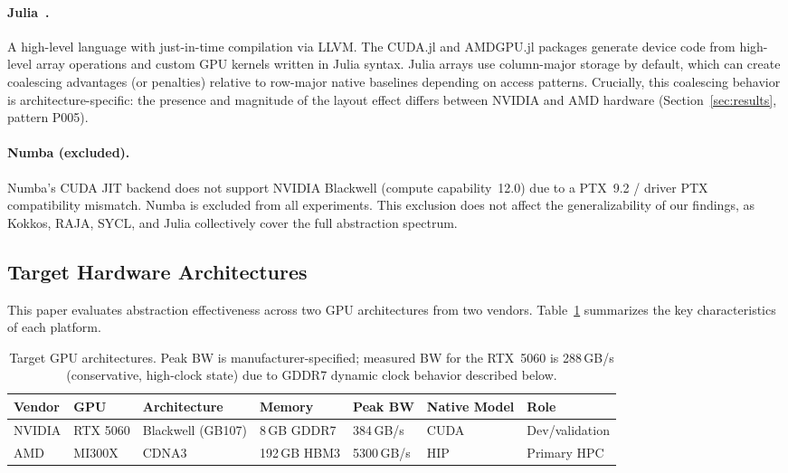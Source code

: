 \paragraph{Julia~\cite{Bezanson2017}.}
A high-level language with just-in-time compilation via LLVM. The CUDA.jl
and AMDGPU.jl packages generate device code from high-level array operations
and custom GPU kernels written in Julia syntax. Julia arrays use
column-major storage by default, which can create coalescing advantages
(or penalties) relative to row-major native baselines depending on
access patterns. Crucially, this coalescing behavior is
architecture-specific: the presence and magnitude of the layout effect
differs between NVIDIA and AMD hardware (Section~\ref{sec:results},
pattern P005).

\paragraph{Numba (excluded).}
Numba's CUDA JIT backend does not support NVIDIA Blackwell (compute
capability~12.0) due to a PTX~9.2 / driver PTX compatibility mismatch.
Numba is excluded from all experiments. This exclusion does not affect
the generalizability of our findings, as Kokkos, RAJA, SYCL, and Julia
collectively cover the full abstraction spectrum.

\subsection{Target Hardware Architectures}
\label{subsec:hardware}

This paper evaluates abstraction effectiveness across two GPU architectures
from two vendors. Table~\ref{tab:hardware} summarizes the key characteristics
of each platform.

\begin{table}[h]
\centering
\caption{Target GPU architectures. Peak BW is manufacturer-specified;
measured BW for the RTX~5060 is 288\,GB/s (conservative, high-clock state)
due to GDDR7 dynamic clock behavior described below.}
\label{tab:hardware}
\begin{tabular}{lllllll}
\hline
\textbf{Vendor} & \textbf{GPU} & \textbf{Architecture} & \textbf{Memory}
& \textbf{Peak BW} & \textbf{Native Model} & \textbf{Role} \\
\hline
NVIDIA & RTX 5060   & Blackwell (GB107) & 8\,GB GDDR7   &  384\,GB/s & CUDA & Dev/validation \\
AMD    & MI300X     & CDNA3             & 192\,GB HBM3  & 5300\,GB/s & HIP  & Primary HPC \\
\hline
\end{tabular}
\end{table}

